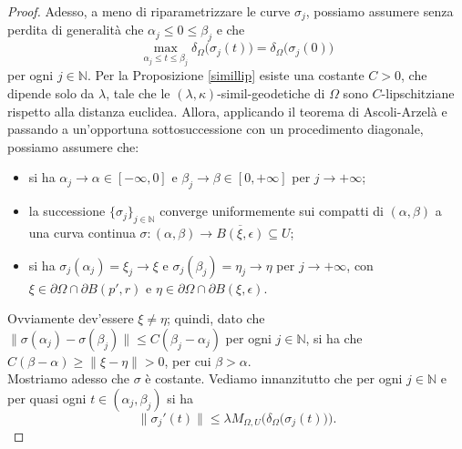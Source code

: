 \begin{proof}
    Adesso, a meno di riparametrizzare le curve $\sigma_j$, possiamo assumere senza perdita di generalità che $\alpha_j\le 0\le\beta_j$ e che
    $$\max_{\alpha_j\le t\le \beta_j}\delta_\Omega\big(\sigma_j(t)\big)=\delta_\Omega\big(\sigma_j(0)\big)$$
    per ogni $j\in\mathbb{N}$. Per la Proposizione \ref{simillip} esiste una costante $C>0$, che dipende solo da $\lambda$, tale che le $(\lambda,\kappa)$-simil-geodetiche di $\Omega$ sono $C$-lipschitziane rispetto alla distanza euclidea. Allora, applicando il teorema di Ascoli-Arzelà e passando a un'opportuna sottosuccessione con un procedimento diagonale, possiamo assumere che:
    \begin{itemize}
        \item si ha $\alpha_j\longrightarrow\alpha\in[-\infty,0]$ e $\beta_j\longrightarrow\beta\in[0,+\infty]$ per $j\longrightarrow+\infty$;
        \item la successione $\{\sigma_j\}_{j\in\mathbb{N}}$ converge uniformemente sui compatti di $(\alpha,\beta)$ a una curva continua $\sigma:(\alpha,\beta)\longrightarrow \overline{B(\xi,\epsilon)}\subseteq U$;
        \item si ha $\sigma_j(\alpha_j)=\xi_j\longrightarrow\xi$ e $\sigma_j(\beta_j)=\eta_j\longrightarrow\eta$ per $j\longrightarrow+\infty$, con ${\xi\in\partial\Omega\cap\partial B(p',r)}$ e $\eta\in\partial\Omega\cap\partial B(\xi,\epsilon)$.
    \end{itemize}

    Ovviamente dev'essere $\xi\not=\eta$; quindi, dato che $\|\sigma(\alpha_j)-\sigma(\beta_j)\| \le C(\beta_j-\alpha_j)$ per ogni $j\in\mathbb{N}$, si ha che $C(\beta-\alpha)\ge\|\xi-\eta\|>0$, per cui $\beta>\alpha$. \\

    Mostriamo adesso che $\sigma$ è costante. Vediamo innanzitutto che per ogni $j\in\mathbb{N}$ e per quasi ogni $t\in(\alpha_j,\beta_j)$ si ha
    $$\|\sigma_j'(t)\| \le \lambda M_{\Omega,U}\Big(\delta_\Omega\big(\sigma_j(t)\big)\Big).$$
    

\end{proof}

